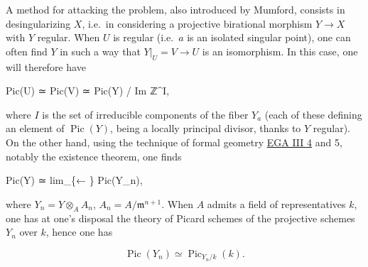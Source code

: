 \documentclass[
  11pt,
  a4paper,
]{book}
\newenvironment{Shaded}{}{}
\newcommand{\NormalTok}[1]{#1}
\begin{document}
A method for attacking the problem, also introduced by Mumford, consists
in desingularizing \(X\), i.e.~in considering a projective birational
morphism \(Y \to X\) with \(Y\) regular. When \(U\) is regular
(i.e.~\(a\) is an isolated singular point), one can often find \(Y\) in
such a way that \(Y|_{U} = V \to U\) is an isomorphism. In this case,
one will therefore have

\begin{Shaded}
\begin{Highlighting}[]
\NormalTok{Pic(U) ≃ Pic(V) ≃ Pic(Y) / Im ℤ\^{}I,}
\end{Highlighting}
\end{Shaded}

where \(I\) is the set of irreducible components of the fiber \(Y_{a}\)
(each of these defining an element of \(\operatorname{Pic}(Y)\), being a
locally principal divisor, thanks to \(Y\) regular). On the other hand,
using the technique of formal geometry
\href{https://jcreinhold.github.io/ega/iii/11-ch3-04-fundamental-theorem-proper-morphisms.html\#4-the-fundamental-theorem-of-proper-morphisms-applications}{EGA
III 4} and 5, notably the existence theorem, one finds

\begin{Shaded}
\begin{Highlighting}[]
\NormalTok{Pic(Y) ≃ lim\_\{← \} Pic(Y\_n),}
\end{Highlighting}
\end{Shaded}

where \(Y_{n} = Y \otimes_{A} A_{n}\), \(A_{n} = A/\mathfrak{m}^{n+1}\).
When \(A\) admits a field of representatives \(k\), one has at one's
disposal the theory of Picard schemes of the projective schemes
\(Y_{n}\) over \(k\), hence one has

\[ \operatorname{Pic}(Y_{n}) \simeq \operatorname{Pic}_{Y_{n}/k}(k). \]
\end{document}
